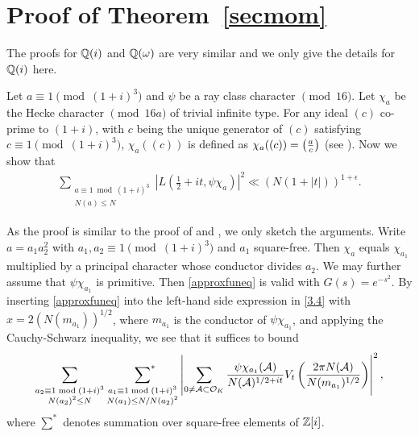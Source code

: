 \documentclass[twoside,leqno,10pt, A4]{amsart}
\begin{document}
\section{Proof of Theorem~\ref{secmom}}

The proofs for $\mathbb Q(i)$ and $\mathbb Q(\omega)$ are very similar and we only give the details for $\mathbb Q(i)$ here. \newline

Let $a \equiv 1 \pmod {(1+i)^3}$ and $\psi$ be a ray class character $\pmod {16}$. Let $\chi_a$ be the Hecke character $\pmod {16a}$ of trivial infinite type. For any ideal $(c)$ co-prime to $(1+i)$, with $c$ being the unique generator of $(c)$ satisfying $c \equiv 1 \pmod {(1+i)^3}$, $\chi_a((c))$ is defined as $\chi_a((c))=\left(\frac{a}{c}\right)$ (see \cite[Example 2, p. 62]{HIEK}). Now we show that
\begin{align}
\label{3.4}
    \sum_{\substack{a \equiv 1 \bmod {(1+i)^3} \\ N(a) \leq N}} \left| L \left( \frac 12+it, \psi\chi_a \right) \right|^2 \ll \left( N(1+|t|) \right)^{1+\epsilon}.
\end{align}

    As the proof is similar to the proof of \cite[Theorem 1.3]{B&Y} and \cite[Corollary 1.4]{BGL}, we only sketch the arguments.
    Write $a=a_1a^2_2$ with $a_1, a_2 \equiv 1 \pmod {(1+i)^3}$ and $a_1$ square-free. Then $\chi_a$ equals $\chi_{a_1}$ multiplied by a principal character whose conductor divides $a_2$.  We may further assume that $\psi\chi_{a_1}$ is primitive. Then \eqref{approxfuneq} is valid with $G(s)=e^{-s^2}$. By inserting \eqref{approxfuneq} into the left-hand side expression in \eqref{3.4} with $x=2(N(m_{a_1}))^{1/2}$, where $m_{a_1}$ is the conductor of $\psi\chi_{a_1}$, and applying the Cauchy-Schwarz inequality, we see that it suffices to bound
\begin{align*}
   \sum_{\substack{a_2 \equiv 1 \bmod {(1+i)^3} \\ N(a_2)^2 \leq N}} \ \sumstar_{\substack{a_1 \equiv 1 \bmod {(1+i)^3} \\ N(a_1) \leq N/N(a_2)^2}} \left| \sum_{0 \neq \mathcal{A} \subset
  \mathcal{O}_K}\frac{\psi\chi_{a_1}(\mathcal{A})}{N(\mathcal{A})^{1/2+it}}V_t\left (\frac{2\pi N(\mathcal{A})}{N(m_{a_1})^{1/2}}  \right) \right|^2,
\end{align*}
     where $\sum^*$ denotes summation over square-free elements of $\mathbb Z[i]$. \newline
     
\end{document}
